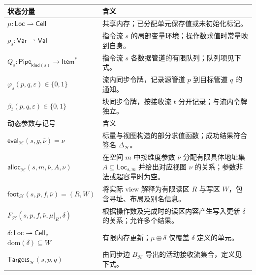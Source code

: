 \documentclass[UTF8,a4paper,11pt,fontset=fandol]{ctexart}
\begin{document}
\begin{center}\small
\begin{tabularx}{\linewidth}{@{}lY@{}}
\toprule
状态分量 & 含义 \\
\midrule
$\mu:\mathsf{Loc}\rightharpoonup\mathsf{Cell}$
 & 共享内存；已分配单元保存值或未初始化标记。\\
$\rho_s:\mathsf{Var}\rightharpoonup\mathsf{Val}$
 & 指令流 $s$ 的局部变量环境；操作数求值时常量映到自身。\\
$Q_s:\mathsf{Pipe}_{\mathsf{kind}(s)}\to\mathsf{Item}^{*}$
 & 指令流 $s$ 各数据管道的有限队列；队列项见下式。\\
$\varphi_s(p,q,\varepsilon)\in\{0,1\}$
 & 流内同步令牌，记录源管道 $p$ 到目标管道 $q$ 的通知。\\
$\beta_t(p,q,\varepsilon)\in\{0,1\}$
 & 块同步令牌，按接收流 $t$ 分开记录；与流内令牌独立。\\
\midrule
动态参数与记号 & 含义 \\
\midrule
$\mathsf{eval}_{\mathcal H}(s,g,\bar\nu)=\nu$
 & 标量与视图构造的部分求值函数；成功结果符合签名 $\Delta_{\mathcal H}$。\\
$\mathsf{alloc}_{\mathcal H}(s,m,\bar\nu,A,\nu)$
 & 在空间 $m$ 中按维度参数 $\bar\nu$ 分配有限具体地址集 $A\subseteq\mathsf{Loc}_{s,m}$ 并给出对应视图 $\nu$ 的关系；参数非法或超容量时为空。\\
$\mathsf{foot}_{\mathcal H}(s,p,f,\bar\nu)=(R,W)$
 & 将实际 view 解释为有限读区 $R$ 与写区 $W$，包含寻址、布局及别名信息。\\
$F_{\mathcal H}(s,p,f,\bar\nu,\mu|_R,\delta)$
 & 根据操作数及完成时的读区内容产生写入更新 $\delta$ 的关系；允许多个结果。\\
$\delta:\mathsf{Loc}\rightharpoonup\mathsf{Cell}$，$\mathrm{dom}(\delta)\subseteq W$
 & 有限内存更新；$\mu\oplus\delta$ 仅覆盖 $\delta$ 定义的单元。\\
$\mathsf{Targets}_{\mathcal H}(s,p,q)$
 & 由同步边 $B_{\mathcal H}$ 导出的活动接收流集合，定义见下式。\\
\bottomrule
\end{tabularx}
\end{center}
\end{document}
